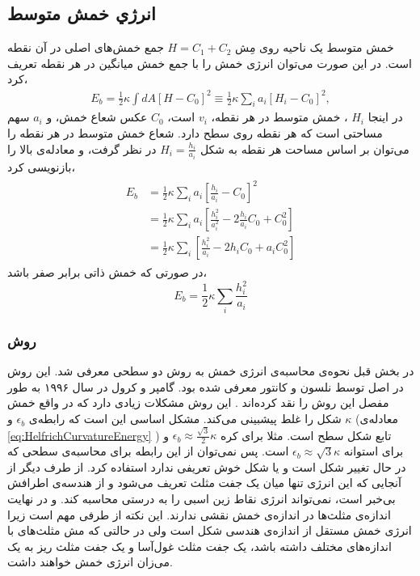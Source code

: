 \setRL



\subsection{
انرژي خمش متوسط
}


خمش متوسط یک ناحیه روی مِش 
$H=C_1+C_2$
جمع خمش‌های اصلی در آن نقطه است. در این صورت می‌توان انرژی خمش را با جمع خمش میانگین در هر نقطه تعریف کرد،
\begin{eqnarray}
E_{b}=\frac{1}{2}\kappa\int dA \left[H-C_0\right]^2\equiv\frac{1}{2}\kappa\sum_i a_i \left[H_i-C_0\right]^2,
\label{eq:bendingDiscretisation}
\end{eqnarray}
در اینجا 
$H_i$
، خمش متوسط در هر نقطه،  
$v_i$
است، 
$C_0$
عکس شعاع خمش،  و 
$a_i$
سهم مساحتی است که هر نقطه روی سطح دارد. شعاع خمش متوسط در هر نقطه را می‌توان بر اساس مساحت هر نقطه به شکل 
$H_i=\frac{h_i}{a_i}$
 در نظر گرفت، و معادله‌ی بالا را بازنویسی کرد،
\begin{eqnarray}
\begin{aligned}
E_{b}&=\frac{1}{2}\kappa\sum_i a_i \left[\frac{h_i}{a_i}-C_0\right]^2\\
&=\frac{1}{2}\kappa\sum_i a_i \left[\frac{h_i^2}{a_i^2}-2\frac{h_i}{a_i}C_0+C_0^2\right]\\
&=\frac{1}{2}\kappa\sum_i \left[\frac{h_i^2}{a_i}-2h_iC_0+a_iC_0^2\right]
\end{aligned}
\label{eq:bendingDiscretisationSpontaneous}
\end{eqnarray}
در صورتی که خمش ذاتی برابر صفر باشد، 
\begin{equation}
E_{b}=\frac{1}{2}\kappa\sum_i \frac{h_i^2}{a_i}
\end{equation}


\subsubsection{
روش 
}
در بخش قبل نحوه‌ی محاسبه‌ی انرژی خمش به روش دو سطحی
معرفی شد. این روش در اصل توسط نلسون و کانتور
\cite{NelsonPRL1987}
معرفی شده بود. گامپر و کرول در سال ۱۹۹۶ به طور مفصل این روش را نقد کرده‌اند
\cite{Gompper1996}
. این روش مشکلات زیادی دارد که در واقع خمش شکل را غلط پیشبینی می‌کند. مشکل اساسی این است که رابطه‌ی 
$\epsilon_b$
و 
$\kappa$
(معادله‌ی  
\ref{eq:HelfrichCurvatureEnergy}
) تابع شکل سطح است.  مثلا برای کره
$\epsilon_b\approx\frac{\sqrt{3}}{2}\kappa$
و برای استوانه
$\epsilon_b\approx\sqrt{3}\kappa$
است. پس نمی‌توان از این رابطه برای محاسبه‌ی سطحی که در حال تغییر شکل است و یا شکل خوش تعریفی ندارد استفاده کرد. 
از طرف دیگر از آنجایی که این انرژی تنها میان یک جفت مثلث تعریف می‌شود و از هندسه‌ی اطرافش بی‌خبر است، نمی‌تواند انرژی نقاط زین اسبی را به درستی محاسبه کند. و در نهایت اندازه‌ی مثلث‌ها در اندازه‌ی خمش نقشی ندارند. این نکته از طرفی مهم است زیرا انرژی خمش مستقل از اندازه‌ی هندسی شکل است ولی در حالتی که مش مثلث‌های با اندازه‌های مختلف داشته باشد، یک جفت مثلث غول‌آسا و یک جفت مثلث ریز به یک می‌زان انرژی خمش خواهند داشت.

